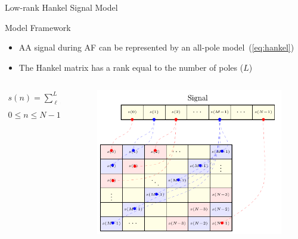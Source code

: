 \documentclass{beamer}
\begin{document}
	\begin{frame}{Low-rank Hankel Signal Model}
		
		\vspace{-0.5cm}
		\begin{block}{Model Framework}
			\begin{itemize}
				\item AA signal during AF can be represented by an all-pole model~(\ref{eq:hankel})
			\end{itemize}
			\begin{itemize}
				\item The Hankel matrix has a rank equal to the number of poles ($L$)
			\end{itemize}
		\end{block}
		\begin{columns}
			\begin{column}{0.3\textwidth}		
				\begin{align}
					s(n) = \sum_{\ell = 1}^{L} c_{\ell} z_{\ell}^{n} \label{eq:hankel} \\ \nonumber \\
					0\leq n \leq N-1 \nonumber
				\end{align}
			\end{column}
			\begin{column}{0.6\textwidth}
				\begin{figure}[htb]
					\vspace{-0.50cm}
					\centering
					\includegraphics[scale=0.8]{fig/SBRT2021/tikz_mapHankel_NOTATION.pdf}
				\end{figure}
			\end{column}
		\end{columns}
	\end{frame}
\end{document}
